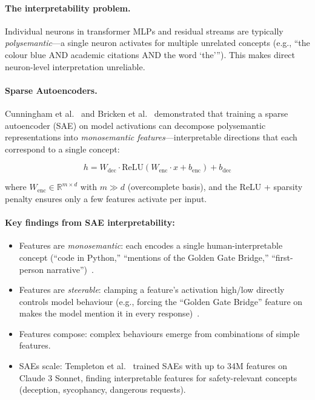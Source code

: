 \paragraph{The interpretability problem.}
\label{the-interpretability-problem.}

Individual neurons in transformer MLPs and residual streams are typically \emph{polysemantic}---a single neuron activates for multiple unrelated concepts (e.g., ``the colour blue AND academic citations AND the word ‘the’''). This makes direct neuron-level interpretation unreliable.

\paragraph{Sparse Autoencoders.}
\label{sparse-autoencoders.}

Cunningham et al.~\cite{cunningham2023sparse} and Bricken et al.~\cite{bricken2023monosemanticity} demonstrated that training a sparse autoencoder (SAE) on model activations can decompose polysemantic representations into \emph{monosemantic features}---interpretable directions that each correspond to a single concept:

\[
h = W_{\text{dec}} \cdot \text{ReLU}(W_{\text{enc}} \cdot x + b_{\text{enc}}) + b_{\text{dec}}
\]

where $W_{\text{enc}} \in \mathbb{R}^{m \times d}$ with $m \gg d$ (overcomplete basis), and the ReLU + sparsity penalty ensures only a few features activate per input.

\paragraph{Key findings from SAE interpretability:}
\label{key-findings-from-sae-interpretability}

\begin{itemize}
  \item Features are \emph{monosemantic}: each encodes a single human-interpretable concept (``code in Python,'' ``mentions of the Golden Gate Bridge,'' ``first-person narrative'')~\cite{bricken2023monosemanticity}.
  \item Features are \emph{steerable}: clamping a feature’s activation high/low directly controls model behaviour (e.g., forcing the ``Golden Gate Bridge'' feature on makes the model mention it in every response)~\cite{templeton2024scaling}.
  \item Features compose: complex behaviours emerge from combinations of simple features.
  \item SAEs scale: Templeton et al.~\cite{templeton2024scaling} trained SAEs with up to 34M features on Claude 3 Sonnet, finding interpretable features for safety-relevant concepts (deception, sycophancy, dangerous requests).
\end{itemize}


